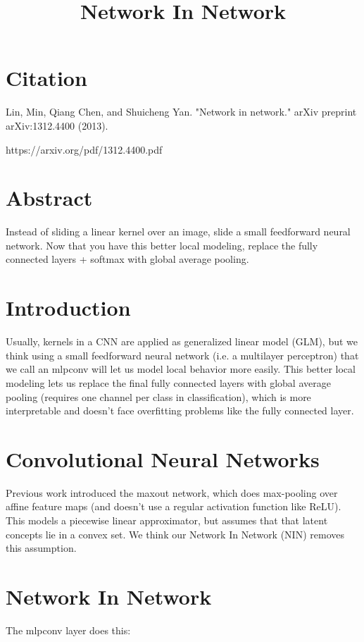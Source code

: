 \documentclass[a4paper]{article}
\title{Network In Network}
\date{}
\begin{document}
\maketitle

\section{Citation}

Lin, Min, Qiang Chen, and Shuicheng Yan. "Network in network." arXiv preprint arXiv:1312.4400 (2013).

https://arxiv.org/pdf/1312.4400.pdf

\section{Abstract}

Instead of sliding a linear kernel over an image, slide a small feedforward
neural network. Now that you have this better local modeling, replace the
fully connected layers + softmax with global average pooling.

\section{Introduction}
Usually, kernels in a CNN are applied as generalized linear model (GLM), but we
think using a small feedforward neural network (i.e. a multilayer perceptron)
that we call an mlpconv will let us model local behavior more easily. This
better local modeling lets us replace the final fully connected layers with
global average pooling (requires one channel per class in classification), which
is more interpretable and doesn't face overfitting problems like the fully
connected layer.

\section{Convolutional Neural Networks}
Previous work introduced the maxout network, which does max-pooling over affine
feature maps (and doesn't use a regular activation function like ReLU). This
models a piecewise linear approximator, but assumes that that latent concepts
lie in a convex set. We think our Network In Network (NIN) removes this
assumption.

\section{Network In Network}
The mlpconv layer does this:
\end{document}
